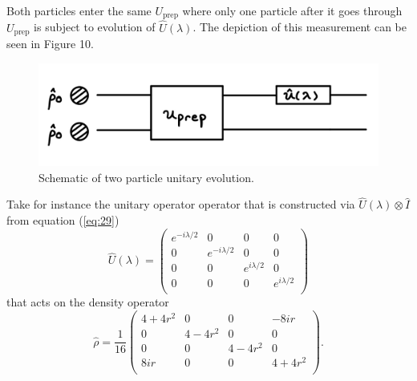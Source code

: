 \documentclass[twocolumn]{article}
\begin{document}
Both particles enter the same $U_{\text{prep}}$ where only one particle after it goes through $U_{\text{prep}}$ is subject to evolution of $\hat{U}(\lambda)$. The depiction of this measurement can be seen in Figure 10.
\begin{figure}[h]
\begin{center}
\includegraphics[width=0.90\linewidth]{Two-Particle-One-Unitary-QFI.jpg}
\caption{Schematic of two particle unitary evolution.}
\end{center}
\end{figure}
\newline
Take for instance the unitary operator operator that is constructed via $\hat{U}(\lambda)\otimes\hat{I}$ from equation (\ref{eq:29})
\begin{equation} \label{eq:83}
\hat{U}(\lambda)=
\left(\begin{array}{cccc}
e^{-i\lambda/2} & 0 & 0 & 0 \\
0 & e^{-i\lambda/2} & 0 & 0 \\
0 & 0 & e^{i\lambda/2} & 0 \\
0 & 0 & 0 & e^{i\lambda/2} \\
\end{array}\right)
\end{equation}
that acts on the density operator
\begin{equation} \label{eq:84}
\hat{\rho}=\frac{1}{16}
\left(\begin{array}{cccc}
4+4r^2 & 0 & 0 & -8ir \\
0 & 4-4r^2 & 0 & 0 \\
0 & 0 & 4-4r^2 & 0 \\
8ir & 0 & 0 & 4+4r^2 \\
\end{array}\right).
\end{equation}
\end{document}
